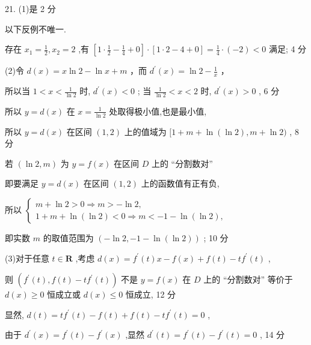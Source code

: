 \documentclass[10pt]{article}
\begin{document}
21. (1)是 2 分

以下反例不唯一.

存在 \({x}_{1} = \frac{1}{2},{x}_{2} = 2\) ,有 \(\left\lbrack  {1 \cdot  \frac{1}{2} - \frac{1}{4} + 0}\right\rbrack   \cdot  \left\lbrack  {1 \cdot  2 - 4 + 0}\right\rbrack   = \frac{1}{4} \cdot  \left( {-2}\right)  < 0\) 满足; 4 分

(2)令 \(d\left( x\right)  = x\ln 2 - \ln x + m\) ，而 \({d}^{\prime }\left( x\right)  = \ln 2 - \frac{1}{x}\) ，

所以当 \(1 < x < \frac{1}{\ln 2}\) 时, \({d}^{\prime }\left( x\right)  < 0\) ; 当 \(\frac{1}{\ln 2} < x < 2\) 时, \({d}^{\prime }\left( x\right)  > 0\) , 6 分

所以 \(y = d\left( x\right)\) 在 \(x = \frac{1}{\ln 2}\) 处取得极小值,也是最小值,

所以 \(y = d\left( x\right)\) 在区间 \(\left( {1,2}\right)\) 上的值域为 \(\lbrack 1 + m + \ln \left( {\ln 2}\right) ,m + \ln 2)\) , 8 分

若 \(\left( {\ln 2,m}\right)\) 为 \(y = f\left( x\right)\) 在区间 \(D\) 上的 “分割数对”

即要满足 \(y = d\left( x\right)\) 在区间 \(\left( {1,2}\right)\) 上的函数值有正有负,

所以 \(\left\{  \begin{array}{l} m + \ln 2 > 0 \Rightarrow  m >  - \ln 2, \\  1 + m + \ln \left( {\ln 2}\right)  < 0 \Rightarrow  m <  - 1 - \ln \left( {\ln 2}\right) , \end{array}\right.\)

即实数 \(m\) 的取值范围为 \(\left( {-\ln 2, - 1 - \ln \left( {\ln 2}\right) }\right)\) ; 10 分

(3)对于任意 \(t \in  \mathbf{R}\) ,考虑 \(d\left( x\right)  = {f}^{\prime }\left( t\right) x - f\left( x\right)  + f\left( t\right)  - t{f}^{\prime }\left( t\right)\) ,

则 \(\left( {{f}^{\prime }\left( t\right) ,f\left( t\right)  - t{f}^{\prime }\left( t\right) }\right)\) 不是 \(y = f\left( x\right)\) 在 \(D\) 上的 “分割数对” 等价于 \(d\left( x\right)  \geq  0\) 恒成立或 \(d\left( x\right)  \leq  0\) 恒成立, 12 分

显然, \(d\left( t\right)  = t{f}^{\prime }\left( t\right)  - f\left( t\right)  + f\left( t\right)  - t{f}^{\prime }\left( t\right)  = 0\) ,

由于 \({d}^{\prime }\left( x\right)  = {f}^{\prime }\left( t\right)  - {f}^{\prime }\left( x\right)\) ,显然 \({d}^{\prime }\left( t\right)  = {f}^{\prime }\left( t\right)  - {f}^{\prime }\left( t\right)  = 0\) , 14 分
\end{document}
